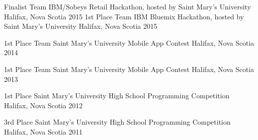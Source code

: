 \documentclass[11pt, a4paper]{awesome-cv}
\begin{document}
\begin{cvhonors}

  \cvhonor
    {Finalist Team} %
    {IBM/Sobeys Retail Hackathon, hosted by Saint Mary's University} %
    {Halifax, Nova Scotia} %
    {2015} %
  \cvhonor
    {1st Place Team} %
    {IBM Bluemix Hackathon, hosted by Saint Mary's University} %
    {Halifax, Nova Scotia} %
    {2015} %

  \cvhonor
    {1st Place Team} %
    {Saint Mary's University Mobile App Contest} %
    {Halifax, Nova Scotia} %
    {2014} %

  \cvhonor
    {1st Place Team} %
    {Saint Mary's University Mobile App Contest} %
    {Halifax, Nova Scotia} %
    {2013} %

  \cvhonor
    {1st Place} %
    {Saint Mary's University High School Programming Competition} %
    {Halifax, Nova Scotia} %
    {2012} %

  \cvhonor
    {3rd Place} %
    {Saint Mary's University High School Programming Competition} %
    {Halifax, Nova Scotia} %
    {2011} %

\end{cvhonors}

%
%
%


\end{document}
